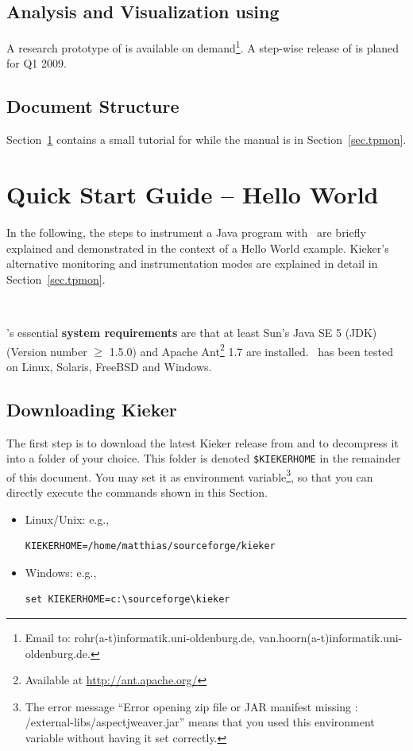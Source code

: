 \documentclass[a4paper,12pt]{scrartcl}
\begin{document}
\subsection{Analysis and Visualization using \tpan{}}
A research prototype of \tpan{} is available on demand\footnote{Email to: rohr(a-t)informatik.uni-oldenburg.de, van.hoorn(a-t)informatik.uni-oldenburg.de.}. A step-wise release of \tpan{} is planed for Q1 2009.

\subsection{Document Structure}

Section~\ref{sec.tpmon.tutorial} contains a small tutorial for \tpmon{} while the manual \tpmon{} is in Section~\ref{sec.tpmon}.%


\section{\tpmon{} Quick Start Guide -- Hello World}\label{sec.tpmon.tutorial}
In the following, the steps to instrument a Java program with \tpmon\ are briefly explained and demonstrated in the context of a Hello World example. Kieker's alternative monitoring and instrumentation modes are explained in detail in Section~\ref{sec.tpmon}.

\

\tpmon{}'s essential \textbf{system requirements} are that at least Sun's Java SE 5 (JDK) (Version number $\geq$ 1.5.0) and Apache Ant\footnote{Available at \url{http://ant.apache.org/}} 1.7 are installed. \tpmon\ has been tested on Linux, Solaris, FreeBSD and Windows.

\subsection{Downloading Kieker}
The first step is to download the latest Kieker release from \kiekerurl{} and to decompress it into a folder of your choice. This folder is denoted \texttt{\$KIEKERHOME} in the remainder of this document. You may set it as environment variable\footnote{The error message ``Error opening zip file or JAR manifest missing : /external-libs/aspectjweaver.jar'' means that you used this environment variable without having it set correctly.}, so that you can directly execute the commands shown in this Section.
\begin{itemize}
 \item Linux/Unix: e.g., %
\begin{lstlisting}[caption={}]
KIEKERHOME=/home/matthias/sourceforge/kieker
\end{lstlisting}
\item Windows: e.g.,
\begin{lstlisting}[caption={}]
set KIEKERHOME=c:\sourceforge\kieker
\end{lstlisting}
\end{itemize}
\end{document}
